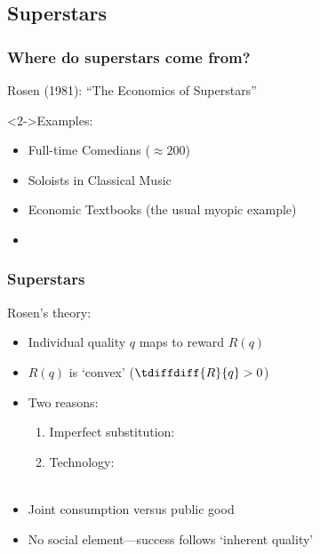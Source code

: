 \subsection{Superstars}

\begin{frame}
  \frametitle{Where do superstars come from?}

  \begin{block}{}
    Rosen (1981): \alert{``The Economics of Superstars''}\cite{rosen1981a}
  \end{block}

  \begin{block}<2->{Examples:}
  \begin{itemize}
  \item<3-> Full-time Comedians ($\approx 200$)
  \item<4-> Soloists in Classical Music
  \item<5-> Economic Textbooks (the usual myopic example)
  \end{itemize}
  \end{block}

  \begin{block}{}
    \begin{itemize}
    \item<6-> 
    \end{itemize}
  \end{block}
  
\end{frame}

\begin{frame}
  \frametitle{Superstars}

  \begin{block}{Rosen's theory:}
    \begin{itemize}
    \item<1-> Individual quality $q$ maps to reward $R(q)$
    \item<2-> $R(q)$ is `convex' ($\tdiffdiff{R}{q} > 0$)
    \item<3-> Two reasons:
      \begin{enumerate}
      \item<3-> \alert{Imperfect substitution:}\\
      \item<5-> \alert{Technology:}\\
        \\
      \end{enumerate}
    \item<7->{Joint consumption versus public good}
    \item<8->{No social element---success follows `inherent quality'}
    \end{itemize}
    
  \end{block}
  
\end{frame}

